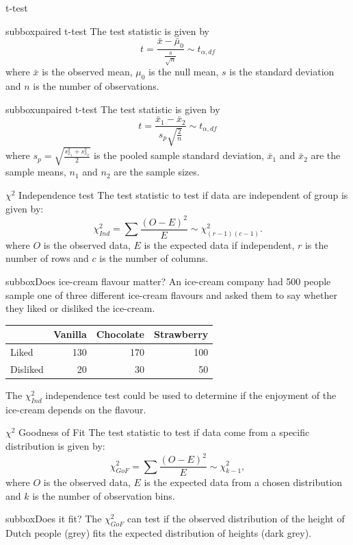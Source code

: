 \documentclass[10pt,a4paper]{article}
\begin{document}
\begin{multicols}{3}
\begin{textbox}{t-test}
\begin{subbox}{subbox}{paired t-test}
 The test statistic is given by  \[ t={\frac {{\bar {x}}-{\bar \mu_0}}{\frac{s}{\sqrt n}}} \sim t_{\alpha,df}\]
where $\bar{x}$ is the observed mean, $\mu_0$ is the null mean, $s$ is the standard deviation and $n$ is the number of observations.
\end{subbox}
\begin{subbox}{subbox}{unpaired t-test}
The test statistic is given by
\[ t={\frac {{\bar {x}}_{1}-{\bar {x}}_{2}}{s_{p}{\sqrt {\frac {2}{n}}}}} \sim t_{\alpha,df}\]
 where
$s_{p}={\sqrt{\frac {s_{x_{1}}^{2}+s_{x_{2}}^{2}}{2}}}$ is the pooled sample standard deviation, $\bar{x}_1$ and $\bar{x}_2$ are the sample means, $n_1$ and $n_2$ are the sample sizes.
\end{subbox}
\end{textbox}
\begin{textbox}{$\chi^2$ Independence test}
The test statistic to test if data are independent of group is given by:
   	\[\chi^2_{Ind}=\sum \frac{(O-E)^2}{E} \sim \chi^2_{(r-1)(c-1)}.\]
where $O$ is the observed data, $E$ is the expected data if independent, $r$ is the number of rows and $c$ is the number of columns.\\
\begin{subbox}{subbox}{Does ice-cream flavour matter?}
\tiny
An ice-cream company had 500 people sample one of three different ice-cream flavours and asked them to say whether they liked or disliked the ice-cream. 
\begin{center}
\begin{tabular}{|l|r|r|r|}
\hline
&Vanilla&Chocolate& Strawberry\\
\hline
Liked&130&170&100\\
\hline
Disliked&20&30&50\\
\hline
\end{tabular}
\end{center}
The $\chi^2_{Ind}$ independence test could be used to determine if the enjoyment of the ice-cream depends on the flavour.\\
\end{subbox}
\end{textbox}
\begin{textbox}{$\chi^2$ Goodness of Fit}
The test statistic to test if data come from a specific distribution is given by:
\[\chi^2_{GoF}=\sum \frac{(O-E)^2}{E} \sim\chi^2_{k-1},\]
where $O$ is the observed data, $E$ is the expected data from a chosen distribution and $k$ is the number of observation bins.
\begin{subbox}{subbox}{Does it fit?}
\tiny
The $\chi^2_{GoF}$ can test if the observed distribution of the height of Dutch people (grey) fits the expected distribution of heights (dark grey).


\end{subbox}
\end{textbox}
\end{multicols}
\end{document}
